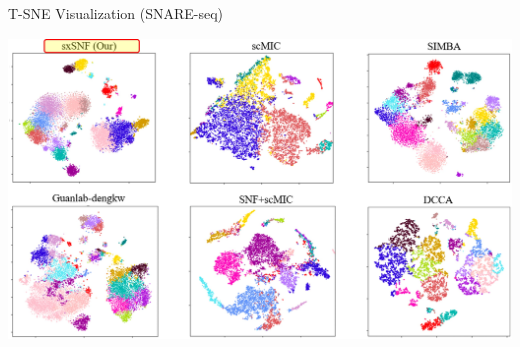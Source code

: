 \documentclass{beamer}
\begin{document}
\begin{frame}{T-SNE Visualization (SNARE-seq)}
\begin{center}
\includegraphics[width=1.0\textwidth,height=8cm,keepaspectratio]{./sxSNF_figure/Fig4.jpg}
\end{center}
\end{frame}
\end{document}
